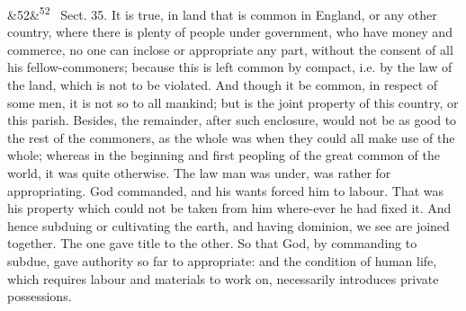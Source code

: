 \documentclass[12pt]{article}
\newcommand{\para}[1][]{\par\noindent\ifx&#1&\else\textsuperscript{\footnotesize #1}~\fi}
\begin{document}
\para[52] Sect. 35. It is true, in land that is common in England, or any other country, where there is plenty of people under government, who have money and commerce, no one can inclose or appropriate any part, without the consent of all his fellow-commoners; because this is left common by compact, i.e. by the law of the land, which is not to be violated. And though it be common, in respect of some men, it is not so to all mankind; but is the joint property of this country, or this parish. Besides, the remainder, after such enclosure, would not be as good to the rest of the commoners, as the whole was when they could all make use of the whole; whereas in the beginning and first peopling of the great common of the world, it was quite otherwise. The law man was under, was rather for appropriating. God commanded, and his wants forced him to labour. That was his property which could not be taken from him where-ever he had fixed it. And hence subduing or cultivating the earth, and having dominion, we see are joined together. The one gave title to the other. So that God, by commanding to subdue, gave authority so far to appropriate: and the condition of human life, which requires labour and materials to work on, necessarily introduces private possessions.
\end{document}
